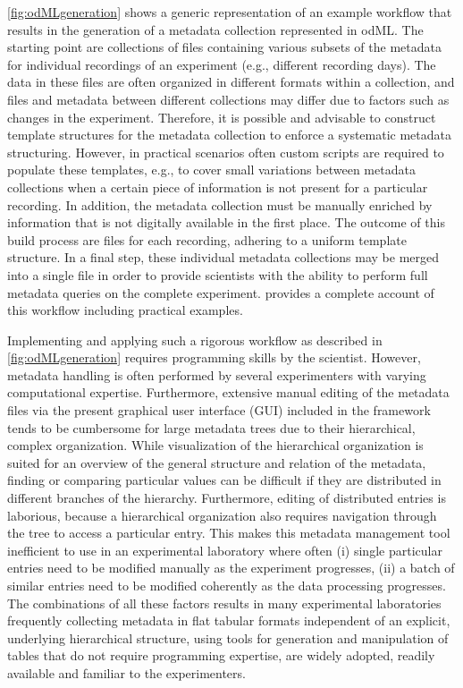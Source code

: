 \cref{fig:odMLgeneration} shows a generic representation of an example workflow that results in the generation of a metadata collection represented in odML. The starting point are collections of files containing various subsets of the metadata for individual recordings of an experiment (e.g., different recording days). The data in these files are often organized in different formats within a collection, and files and metadata between different collections may differ due to factors such as changes in the experiment. Therefore, it is possible and advisable to construct template structures for the metadata collection to enforce a systematic metadata structuring. However, in practical scenarios often custom scripts are required to populate these templates, e.g., to cover small variations between metadata collections when a certain piece of information is not present for a particular recording. In addition, the metadata collection must be manually enriched by information that is not digitally available in the first place. The outcome of this build process are  files for each recording, adhering to a uniform template structure. In a final step, these individual metadata collections may be merged into a single  file in order to provide scientists with the ability to perform full metadata queries on the complete experiment. \citet{Zehl_2016} provides a complete account of this workflow including practical examples.

Implementing and applying such a rigorous workflow as described in \cref{fig:odMLgeneration} requires programming skills by the scientist. However, metadata handling is often performed by several experimenters with varying computational expertise. Furthermore, extensive manual editing of the metadata files via the present graphical user interface (GUI) included in the  framework tends to be cumbersome for large metadata trees due to their hierarchical, complex organization. While visualization of the hierarchical organization is suited for an overview of the general structure and relation of the metadata, finding or comparing particular values can be difficult if they are distributed in different branches of the hierarchy. Furthermore, editing of distributed entries is laborious, because a hierarchical organization also requires navigation through the tree to access a particular entry. This makes this metadata management tool inefficient to use in an experimental laboratory where often (i) single particular entries need to be modified manually as the experiment progresses, (ii) a batch of similar entries need to be modified coherently as the data processing progresses. The combinations of all these factors results in many experimental laboratories frequently collecting metadata in flat tabular formats independent of an explicit, underlying hierarchical structure, using tools for generation and manipulation of tables that do not require programming expertise, are widely adopted, readily available and familiar to the experimenters.

